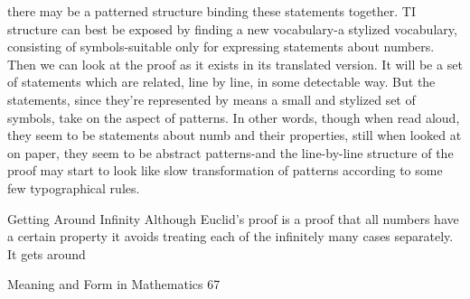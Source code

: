 there may be a patterned structure binding these statements together. TI structure can
best be exposed by finding a new vocabulary-a stylized vocabulary, consisting of
symbols-suitable only for expressing statements about numbers. Then we can look at the
proof as it exists in its translated version. It will be a set of statements which are related,
line by line, in some detectable way. But the statements, since they're represented by
means a small and stylized set of symbols, take on the aspect of patterns. In other words,
though when read aloud, they seem to be statements about numb and their properties, still
when looked at on paper, they seem to be abstract patterns-and the line-by-line structure
of the proof may start to look like slow transformation of patterns according to some few
typographical rules.

                                   Getting Around Infinity
Although Euclid's proof is a proof that all numbers have a certain property it avoids
treating each of the infinitely many cases separately. It gets around




Meaning and Form in Mathematics                                                             67


